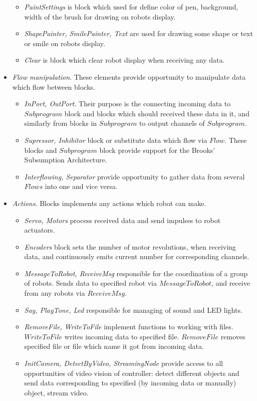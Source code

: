 \documentclass[conference,compsoc]{IEEEtran}
\begin{document}
\begin{itemize}
\begin{itemize}
\item \textit{PaintSettings} is block which used for define color of pen, background, width of the brush for drawing on robots display.
\item \textit{ShapePainter, SmilePainter, Text} are used for drawing some shape or text or smile on robots display. 
\item \textit{Clear} is block which clear robot display when receiving any data.
\end{itemize} 
\item \textit{Flow manipulation}. These elements provide opportunity to manipulate data which flow between blocks.
\begin{itemize}
\item \textit{InPort, OutPort}. Their purpose is the connecting incoming data to $Subprogram$ block and blocks which should received these data in it, and similarly from blocks in $Subprogram$ to output channels of $Subprogram$. 
\item \textit{Supressor, Inhibitor} block or substitute data which flow via $Flow$. These blocks and $Subprogram$ block provide support for the Brooks' Subsumption Architecture. 
\item \textit{Interflowing, Separator} provide opportunity to gather data from several $Flows$ into one and vice versa.
\end{itemize} 
\item \textit{Actions}. Blocks implements any actions which robot can make.
\begin{itemize}
\item \textit{Servo, Motors} process received data and send impulses to robot actuators.
\item \textit{Encoders} block sets the number of motor revolutions, when receiving data, and continuously emits current number for corresponding channels.
\item \textit{MessageToRobot, ReceiveMsg} responsible for the coordination of a group of robots. Sends data to specified robot via $MessageToRobot$, and receive from any robots via $ReceiveMsg$.
\item \textit{Say, PlayTone, Led} responsible for managing of sound and LED lights.
\item \textit{RemoveFile, WriteToFile} implement functions to working with files. $WriteToFile$ writes incoming data to specified file. $RemoveFile$ removes specified file or file which name it got from incoming data.
\item \textit{InitCamera, DetectByVideo, StreamingNode} provide access to all opportunities of video vision of controller: detect different objects and send data corresponding to specified (by incoming data or manually) object, stream video.

\end{itemize}
\end{itemize}
\end{document}
